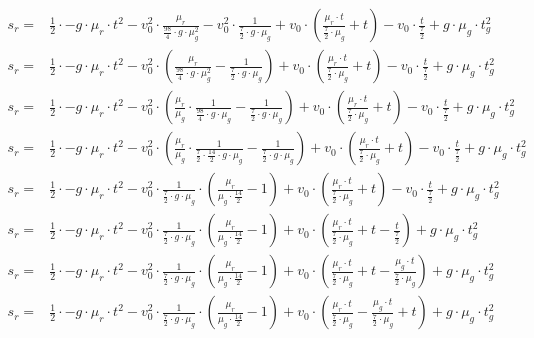 \begin{equation}
\begin{aligned}
    s_r = & \frac{1}{2} \cdot -g \cdot \mu_r \cdot t^2 - v_0^2 \cdot \frac{\mu_r}{\frac{98}{4} \cdot g \cdot \mu_g^2} - v_0^2 \cdot \frac{1}{\frac{7}{2} \cdot g \cdot \mu_g} + v_0 \cdot (\frac{\mu_r \cdot t}{\frac{7}{2} \cdot \mu_g} + t) - v_0 \cdot \frac{t}{\frac{7}{2}} + g \cdot \mu_g \cdot t_g^2\\
    s_r = & \frac{1}{2} \cdot -g \cdot \mu_r \cdot t^2 - v_0^2 \cdot (\frac{\mu_r}{\frac{98}{4} \cdot g \cdot \mu_g^2} - \frac{1}{\frac{7}{2} \cdot g \cdot \mu_g}) + v_0 \cdot (\frac{\mu_r \cdot t}{\frac{7}{2} \cdot \mu_g} + t) - v_0 \cdot \frac{t}{\frac{7}{2}} + g \cdot \mu_g \cdot t_g^2\\
    s_r = & \frac{1}{2} \cdot -g \cdot \mu_r \cdot t^2 - v_0^2 \cdot (\frac{\mu_r}{\mu_g} \cdot \frac{1}{\frac{98}{4} \cdot g \cdot \mu_g} - \frac{1}{\frac{7}{2} \cdot g \cdot \mu_g}) + v_0 \cdot (\frac{\mu_r \cdot t}{\frac{7}{2} \cdot \mu_g} + t) - v_0 \cdot \frac{t}{\frac{7}{2}} + g \cdot \mu_g \cdot t_g^2\\
    s_r = & \frac{1}{2} \cdot -g \cdot \mu_r \cdot t^2 - v_0^2 \cdot (\frac{\mu_r}{\mu_g} \cdot \frac{1}{\frac{7}{2} \cdot \frac{14}{2} \cdot g \cdot \mu_g} - \frac{1}{\frac{7}{2} \cdot g \cdot \mu_g}) + v_0 \cdot (\frac{\mu_r \cdot t}{\frac{7}{2} \cdot \mu_g} + t) - v_0 \cdot \frac{t}{\frac{7}{2}} + g \cdot \mu_g \cdot t_g^2\\
    s_r = & \frac{1}{2} \cdot -g \cdot \mu_r \cdot t^2 - v_0^2 \cdot \frac{1}{\frac{7}{2} \cdot g \cdot \mu_g} \cdot (\frac{\mu_r}{\mu_g \cdot \frac{14}{2}} - 1) + v_0 \cdot (\frac{\mu_r \cdot t}{\frac{7}{2} \cdot \mu_g} + t) - v_0 \cdot \frac{t}{\frac{7}{2}} + g \cdot \mu_g \cdot t_g^2\\
    s_r = & \frac{1}{2} \cdot -g \cdot \mu_r \cdot t^2 - v_0^2 \cdot \frac{1}{\frac{7}{2} \cdot g \cdot \mu_g} \cdot (\frac{\mu_r}{\mu_g \cdot \frac{14}{2}} - 1) + v_0 \cdot (\frac{\mu_r \cdot t}{\frac{7}{2} \cdot \mu_g} + t - \frac{t}{\frac{7}{2}}) + g \cdot \mu_g \cdot t_g^2\\
    s_r = & \frac{1}{2} \cdot -g \cdot \mu_r \cdot t^2 - v_0^2 \cdot \frac{1}{\frac{7}{2} \cdot g \cdot \mu_g} \cdot (\frac{\mu_r}{\mu_g \cdot \frac{14}{2}} - 1) + v_0 \cdot (\frac{\mu_r \cdot t}{\frac{7}{2} \cdot \mu_g} + t - \frac{\mu_g \cdot t}{\frac{7}{2} \cdot \mu_g}) + g \cdot \mu_g \cdot t_g^2\\
    s_r = & \frac{1}{2} \cdot -g \cdot \mu_r \cdot t^2 - v_0^2 \cdot \frac{1}{\frac{7}{2} \cdot g \cdot \mu_g} \cdot (\frac{\mu_r}{\mu_g \cdot \frac{14}{2}} - 1) + v_0 \cdot (\frac{\mu_r \cdot t}{\frac{7}{2} \cdot \mu_g} - \frac{\mu_g \cdot t}{\frac{7}{2} \cdot \mu_g} + t) + g \cdot \mu_g \cdot t_g^2\\

\end{aligned}
\end{equation}
